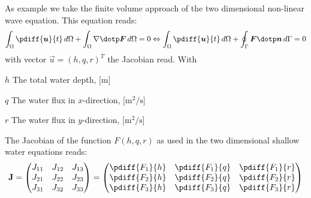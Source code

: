 As example we take the finite volume approach of the two dimensional non-linear wave equation.
This equation reads:
%
\begin{align}
    \int_\Omega \pdiff{\vec{u}}{t}\, d\Omega  + \int_\Omega \nabla \dotp \vec{F}\, d\Omega = 0
    \Leftrightarrow
    \int_\Omega \pdiff{\vec{u}}{t}\, d\Omega  + \oint_\Gamma \vec{F} \dotp \vec{n} \, d\Gamma = 0
\end{align}
with vector $\vec{u} = (h, q, r)^T$ the Jacobian read.
With
\begin{symbollist}
    \item[$h$] The total water depth, [$\si{\metre}$]
    \item[$q$] The water flux in $x$-direction, [$\si{\square\metre\per\second}$]
    \item[$r$] The water flux in $y$-direction, [$\si{\square\metre\per\second}$]
\end{symbollist}

The Jacobian of the function $F(h, q, r)$ as used in the two dimensional shallow water equations reads:
\begin{align}
    \mat{J} =
    \begin{pmatrix}
        J_{11} & J_{12} & J_{13} \\
        J_{21} & J_{22} & J_{23} \\
        J_{31} & J_{32} & J_{33}
    \end{pmatrix}
    =
    \begin{pmatrix}
        \pdiff{F_1}{h} & \pdiff{F_1}{q} &  \pdiff{F_1}{r} \\
        \pdiff{F_2}{h} & \pdiff{F_2}{q} &  \pdiff{F_2}{r} \\
        \pdiff{F_3}{h} & \pdiff{F_3}{q} &  \pdiff{F_3}{r}
    \end{pmatrix}
\end{align}


